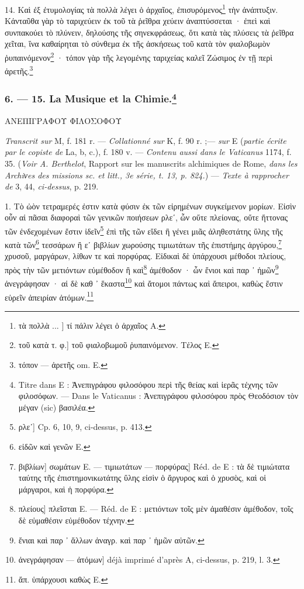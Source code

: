 \documentclass[a4paper, 11pt, oneside, polutonikogreek, french]{article}
\begin{document}
14. Καὶ ἐξ ἐτυμολογίας τὰ πολλὰ λέγει ὁ ἀρχαῖος, ἐπισυρόμενος\footnote{τὰ πολλὰ ... ] τί πάλιν λέγει ὁ ἀρχαῖος A.} τὴν ἀνάπτυξιν. Κἀνταῦθα γὰρ τὸ ταριχεύειν ἐκ τοῦ τὰ ῥεῖθρα χεύειν ἀναπτύσσεται · ἐπεὶ καὶ συνπακούει τὸ πλύνειν, δηλούσης τῆς σηνεκφράσεως, ὅτι κατὰ τὰς πλύσεις τὰ ῥεῖθρα χεῖται, ἵνα καθαίρηται τὸ σύνθεμα ἐκ τῆς ἀσκήσεως τοῦ κατὰ τὸν φιαλοβωμὸν ῥυπαινόμενον\footnote{τοῦ κατὰ τ. φ.] τοῦ φιαλοβωμοῦ ῥυπαινόμενον. Τέλος E.} · τόπον γὰρ τῆς λεγομένης ταριχείας καλεῖ Ζώσιμος ἐν τῇ περὶ ἀρετῆς.\footnote{τόπον --- ἀρετῆς om. E.}

\bigskip
\centerline{\EightStarTaper}
\centerline{\EightStarTaper\EightStarTaper}
\bigskip

\subsubsection[6. --- 15. La Musique et la Chimie.]{6. --- 15. La Musique et la Chimie.\footnote{Titre dans E : Ἀνεπιγράφου φιλοσόφου περὶ τῆς θείας καὶ ἱερᾶς τέχνης τῶν φιλοσόφων. --- Dans le Vaticanus : Ἀνεπιγράφου φιλοσόφου πρὸς Θεοδόσιον τὸν μέγαν (sic) βασιλέα.}}

ΑΝΕΠΙΓΡΑΦΟΥ ΦΙΛΟΣΟΦΟΥ

\emph{Transcrit sur} M, f. 181 r. --- \emph{Collationné sur} K, f. 90 r. ;--- \emph{sur} E (\emph{partie écrite par le copiste de} La, b, c.), f. 180 v. --- \emph{Contenu aussi dans le Vaticanus} 1174, f. 35. (\emph{Voir A. Berthelot}, Rapport sur les manuscrits alchimiques de Rome, \emph{dans les Archiνes des missions sc. et litt., 3e série, t. 13, p. 824.}) --- \emph{Texte à rapprocher de} 3, 44, \emph{ci-dessus}, p. 219.

1. Τὸ ὠὸν τετραμερές ἐστιν κατὰ φύσιν ἐκ τῶν εἰρημένων συγκείμενον μορίων. Εἰσὶν οὖν αἱ πᾶσαι διαφοραὶ τῶν γενικῶν ποιήσεων ρλεʹ, ὧν οὔτε πλείονας, οὔτε ἥττονας τῶν ἐνδεχομένων ἔστιν ἰδεῖν\footnote{ρλεʹ] Cp. 6, 10, 9, ci-dessus, p. 413.} ἐπὶ τῆς τῶν εἴδει ἢ γένει μιᾶς ἀληθεστάτης ὕλης τῆς κατὰ τῶν\footnote{εἰδῶν καὶ γενῶν E.} τεσσάρων ἢ εʹ βιβλίων χωρούσης τιμιωτάτων τῆς ἐπιστήμης ἀργύρου,\footnote{βιβλίων] σωμάτων E. --- τιμιωτάτων --- πορφύρας] Réd. de E : τὰ δὲ τιμιώτατα ταύτης τῆς ἐπιστημονικωτάτης ὕλης εἰσὶν ὁ ἄργυρος καὶ ὁ χρυσὸς, καὶ οἱ μάργαροι, καὶ ἡ πορφύρα.} χρυσοῦ, μαργάρων, λίθων τε καὶ πορφύρας. Εἰδικαὶ δὲ ὑπάρχουσι μέθοδοι πλείους, πρὸς τὴν τῶν μετιόντων εὐμέθοδον ἢ καὶ\footnote{πλείους] πλεῖσται E. --- Réd. de E : μετιόντων τοῖς μὲν ἀμαθέσιν ἀμέθοδον, τοῖς δὲ εὐμαθέσιν εὐμέθοδον τέχνην.} ἀμέθοδον · ὧν ἔνιοι καὶ παρ ᾽ ἡμῶν\footnote{ἔνιαι καὶ παρ ᾽ ἄλλων ἀναγρ. καὶ παρ ᾽ ἡμῶν αὐτῶν.} ἀνεγράφησαν · αἱ δὲ καθ ᾽ ἕκαστα\footnote{ἀνεγράφησαν --- ἀτόμων] déjà imprimé d'après A, ci-dessus, p. 219, l. 3.} καὶ ἄτομοι πάντως καὶ ἄπειροι, καθὼς ἔστιν εὑρεῖν ἀπειρίαν ἀτόμων.\footnote{ἄπ. ὑπάρχουσι καθὼς E.}
\end{document}
